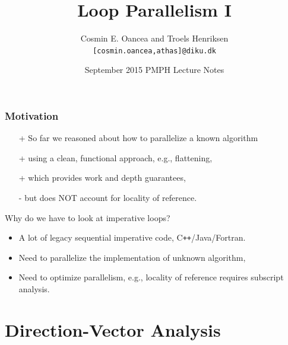 \documentclass{beamer}
\title[Loop Parallelism]{Loop Parallelism I}
\author[C.~Oancea]{Cosmin E. Oancea and Troels Henriksen\\{\tt [cosmin.oancea,athas]@diku.dk}}
\institute{Department of Computer Science (DIKU)\\University of Copenhagen}
\date[Sept 2015]{September 2015 PMPH Lecture Notes}
\newcommand{\emp}[1]{\textcolor{DikuRed}{ #1}}
\begin{document}
\titleslide




\begin{frame}
  \frametitle{Motivation}

\begin{itemize}
    \item[+] So far we reasoned about how to parallelize a known algorithm
    \item[+] using a clean, functional approach, e.g., flattening, 
    \item[+] which provides work and depth guarantees,
    \item[\alert{-}] but does \alert{NOT} account for locality of reference.

\end  {itemize}\bigskip

\emp{Why do we have to look at imperative loops?}\pause
\begin{itemize}    
    \item A lot of legacy sequential imperative code, C{\tt++}/Java/Fortran.\medskip
    \item Need to parallelize the implementation of unknown algorithm,\medskip
    \item Need to optimize parallelism, e.g., locality of reference requires subscript analysis. 
\end  {itemize}  

\end{frame}


\section{Direction-Vector Analysis}

\begin{frame}[fragile]
	\tableofcontents[currentsection]
\end{frame}
\end{document}
